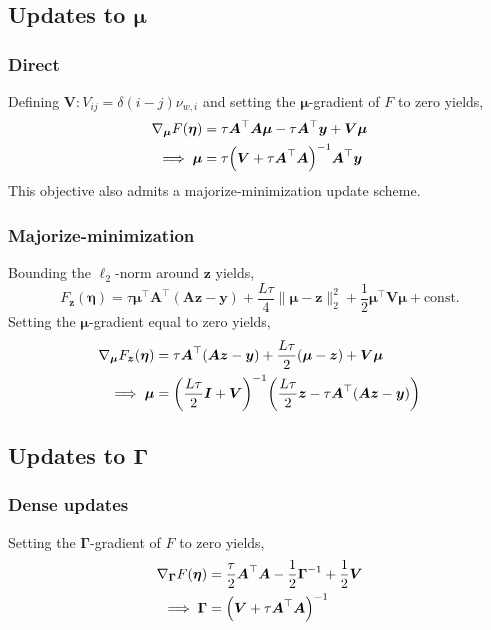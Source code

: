 \documentclass{article}
\numberwithin{equation}{section}
\newcommand{\lh}{\mathopen{}\mathclose\bgroup\left}
\newcommand{\rh}{\aftergroup\egroup\right}
\newcommand{\m}[1]{\boldsymbol{#1}}
\begin{document}
\subsection{Updates to $\m{\mu}$}
\subsubsection{Direct}
Defining $\m{V} : V_{ij} = \delta(i-j) \nu_{w,i}$ and setting the
$\m{\mu}$-gradient of $F$ to zero yields,
\begin{equation}
\begin{aligned}
\nabla_{\m{\mu}} F(\m{\eta}) &=
 \tau \m{A}^\top \m{A} \m{\mu} - \tau \m{A}^\top \m{y} + \m{V} \m{\mu}
\\ \implies
\m{\mu} &=
 \tau \lh( \m{V} + \tau \m{A}^\top \m{A} \rh)^{-1} \m{A}^\top \m{y}
\end{aligned}
\end{equation}
This objective also admits a majorize-minimization update scheme.

\subsubsection{Majorize-minimization}
Bounding the $\ell_2$-norm around $\m{z}$ yields,
\begin{equation}
F_{\m{z}}(\m{\eta}) =
  \tau \m{\mu}^\top \m{A}^\top (\m{A} \m{z} - \m{y}) +
  \frac{L \tau}{4} \| \m{\mu} - \m{z} \|_2^2
 + \frac{1}{2} \m{\mu}^\top \m{V} \m{\mu} + \text{const.}
\end{equation}
Setting the $\m{\mu}$-gradient equal to zero yields,
\begin{equation}
\begin{aligned}
\nabla_{\m{\mu}} F_{\m{z}}(\m{\eta}) &=
 \tau \m{A}^\top (\m{A} \m{z} - \m{y}) +
 \frac{L \tau}{2} (\m{\mu} - \m{z}) +
 \m{V} \m{\mu}
\\ \implies
\m{\mu} &=
 \lh( \frac{L \tau}{2} \m{I} + \m{V} \rh)^{-1}
 \lh( \frac{L \tau}{2} \m{z} - \tau \m{A}^\top (\m{A} \m{z} - \m{y}) \rh)
\end{aligned}
\end{equation}

\subsection{Updates to $\m{\Gamma}$}
\subsubsection{Dense updates}
Setting the $\m{\Gamma}$-gradient of $F$ to zero yields,
\begin{equation}
\begin{aligned}
\nabla_{\m{\Gamma}} F(\m{\eta}) &=
 \frac{\tau}{2} \m{A}^\top \m{A} - \frac{1}{2} \m{\Gamma}^{-1} +
 \frac{1}{2} \m{V}
\\ \implies
\m{\Gamma} &=
 \lh( \m{V} + \tau \m{A}^\top \m{A} \rh)^{-1}
\end{aligned}
\end{equation}
\end{document}
